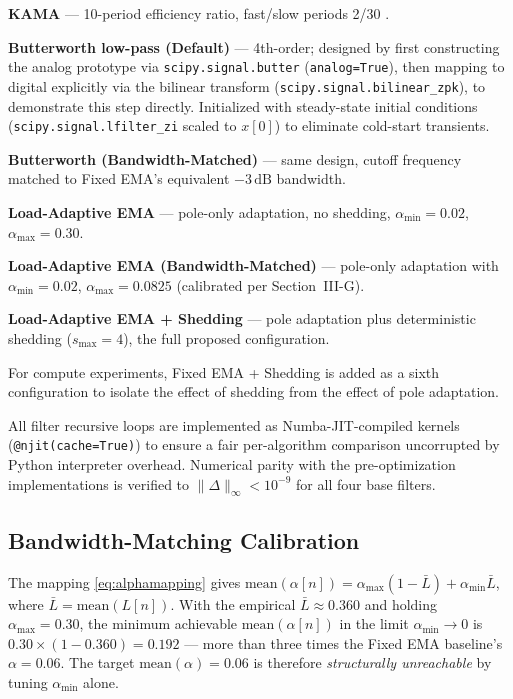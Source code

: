 \documentclass[conference]{IEEEtran}
\begin{document}
\smallskip
\noindent\textbf{KAMA} — 10-period efficiency ratio, fast/slow periods 2/30
\cite{kama}.

\smallskip
\noindent\textbf{Butterworth low-pass (Default)} — 4th-order; designed by
first constructing the analog prototype via \texttt{scipy.signal.butter}
(\texttt{analog=True}), then mapping to digital explicitly via the bilinear
transform (\texttt{scipy.signal.bilinear\_zpk}), to demonstrate this step
directly. Initialized with steady-state initial conditions
(\texttt{scipy.signal.lfilter\_zi} scaled to $x[0]$) to eliminate cold-start
transients.

\smallskip
\noindent\textbf{Butterworth (Bandwidth-Matched)} — same design, cutoff
frequency matched to Fixed EMA's equivalent $-3\,\text{dB}$ bandwidth.

\smallskip
\noindent\textbf{Load-Adaptive EMA} — pole-only adaptation, no shedding,
$\alpha_\text{min}=0.02$, $\alpha_\text{max}=0.30$.

\smallskip
\noindent\textbf{Load-Adaptive EMA (Bandwidth-Matched)} — pole-only
adaptation with $\alpha_\text{min}=0.02$, $\alpha_\text{max}=0.0825$
(calibrated per Section~III-G).

\smallskip
\noindent\textbf{Load-Adaptive EMA + Shedding} — pole adaptation plus
deterministic shedding ($s_\text{max}=4$), the full proposed configuration.

For compute experiments, Fixed EMA + Shedding is added as a sixth
configuration to isolate the effect of shedding from the effect of
pole adaptation.

All filter recursive loops are implemented as Numba-JIT-compiled kernels
(\texttt{@njit(cache=True)}) to ensure a fair per-algorithm comparison
uncorrupted by Python interpreter overhead. Numerical parity with the
pre-optimization implementations is verified to $\|\Delta\|_\infty < 10^{-9}$
for all four base filters.

\subsection{Bandwidth-Matching Calibration}
\label{sec:bwmatch}
The mapping \eqref{eq:alphamapping} gives
$\text{mean}(\alpha[n]) = \alpha_\text{max}(1-\bar{L})
+ \alpha_\text{min}\bar{L}$,
where $\bar{L}=\text{mean}(L[n])$. With the empirical $\bar{L}\approx0.360$
and holding $\alpha_\text{max}=0.30$, the minimum achievable
$\text{mean}(\alpha[n])$ in the limit $\alpha_\text{min}\rightarrow 0$ is
$0.30\times(1-0.360)=0.192$ — more than three times the Fixed EMA baseline's
$\alpha=0.06$. The target $\text{mean}(\alpha)=0.06$ is therefore
\emph{structurally unreachable} by tuning $\alpha_\text{min}$ alone.
\end{document}
